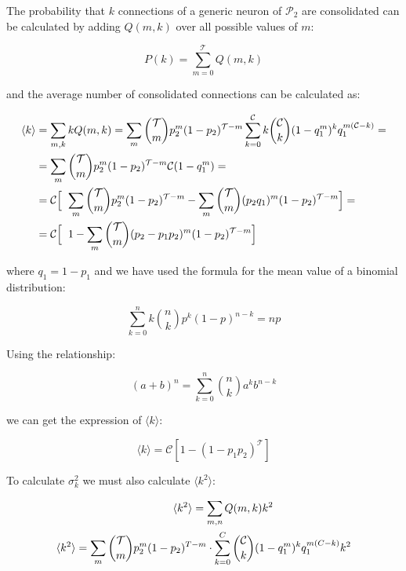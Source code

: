 \documentclass[a4paper, 12pt, twoside, openright]{book}
\newcommand{\popII}{\mathcal{P}_2}
\newcommand{\T}{\mathcal{T}}
\newcommand{\C}{\mathcal{C}}
\begin{document}
The probability that $k$ connections of a generic neuron of $\popII$ are consolidated can be calculated by adding $Q(m,k)$ over all possible values of $m$:

\begin{equation}
    P(k) = \sum_{m=0}^\T Q(m,k)
\end{equation}

and the average number of consolidated connections can be calculated as:

\begin{equation}
\begin{split}
    \langle k \rangle &= \sum_{m,k}  k Q(m,k) = \sum_m \binom{\T}{m} p_{2}^m (1-p_2)^{\T-m} \sum_{k=0}^{\C} k \binom{\C}{k} (1-q_1^m)^k q_1^{m (\C-k)} =\\
    &= \sum_m \binom{\T}{m} p_{2}^m (1-p_2)^{\T-m} \C(1-q_1^m)
    =\\
    &= \C \Bigl[\hspace{0.2cm}\sum_m \binom{\T}{m} p_{2}^m (1-p_2)^{\T-m}
    - \sum_m \binom{\T}{m} (p_2 q_1)^m (1-p_2)^{\T-m} \Bigr]
    =\\
    &= \C \Bigl[\hspace{0.2cm}
    1 - \sum_m \binom{\T}{m} (p_2 - p_1 p_2)^m (1-p_2)^{\T-m} \Bigr]
    \end{split}
\end{equation}

where $q_1 = 1 - p_1$ and we have used the formula for the mean value of a binomial distribution:

\begin{equation}
\sum_{k=0}^{n} k \binom{n}{k} p^k (1-p)^{n-k}= np
\end{equation}

Using the relationship:

\begin{equation}
    (a+b)^n=\sum_{k=0}^n \binom{n}{k} a^k b^{n-k}
\end{equation}

we can get the expression of $\langle k \rangle$:

\begin{equation}
\label{eq:avg_k}
    \langle k \rangle = \C [1-(1-p_1 p_2)^\T]
\end{equation}

To calculate $\sigma_{k}^2$ we must also calculate $\langle k^2 \rangle$:

\begin{equation}
\begin{split}
    \langle k^2 \rangle= \sum_{m,n} Q(m,k) k^2 \hspace{2.5cm}\\
    \langle k^2 \rangle= \sum_m \binom{\T}{m} p_{2}^m (1-p_2)^{T-m} \cdot \sum_{k=0}^C \binom{\C}{k} (1-q_1^m)^k q_1^{m (C-k)} k^2
    \end{split}
\end{equation}
\end{document}
